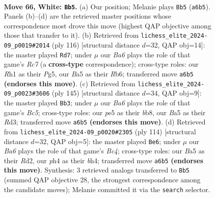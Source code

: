 \documentclass[11pt]{article}
\begin{document}
\clearpage

\begin{figure}[p]\centering
\begin{subfigure}{0.46\textwidth}\centering
\resizebox{\linewidth}{!}{%
\newchessgame
\chessboard[
  setfen={1r6/4b3/Bn1p2kp/B3p3/4P2p/5P2/5K2/7R w - - 1 66},
  showmover=false,
  pgfstyle=straightmove, color=movearrow, markmove={a6-b5}
]}
\caption{}
\end{subfigure}\hfill
\begin{subfigure}{0.46\textwidth}\centering
\resizebox{\linewidth}{!}{%
\newchessgame
\chessboard[
  setfen={8/2R5/1R1n2p1/p3kpP1/P7/1p1r4/6P1/6K1 w - - 10 59},
  showmover=false,
  pgfstyle=straightmove, color=movearrow, markmove={c7-d7}
]}
\caption{}
\end{subfigure}
\\[4pt]
\begin{subfigure}{0.46\textwidth}\centering
\resizebox{\linewidth}{!}{%
\newchessgame
\chessboard[
  setfen={1B6/6pk/5p2/8/2b3P1/3rPPK1/8/4R3 b - - 33 73},
  showmover=false,
  pgfstyle=straightmove, color=movearrow, markmove={c4-b3}
]}
\caption{}
\end{subfigure}\hfill
\begin{subfigure}{0.46\textwidth}\centering
\resizebox{\linewidth}{!}{%
\newchessgame
\chessboard[
  setfen={8/6k1/1r1p2p1/4p3/2B1Pp1b/5P2/3R4/5K2 w - - 8 58},
  showmover=false,
  pgfstyle=straightmove, color=movearrow, markmove={c4-e6}
]}
\caption{}
\end{subfigure}
\caption{\textbf{Move 66, White: \texttt{Bb5}.} (a) Our position; Melanie plays \texttt{Bb5} (\texttt{a6b5}). Panels (b)--(d) are the retrieved master positions whose correspondence most drove this move (highest QAP objective among those that transfer to it). (b) Retrieved from \texttt{lichess\_elite\_2024-09\_p0019\#2014} (ply 116) [structural distance $d$=32, QAP obj=14]: the master played \texttt{Rd7}; under $\mu$ our \emph{Ba6} plays the role of that game's \emph{Rc7} (a \textbf{cross-type} correspondence); cross-type roles: our \emph{R}h1 as their \emph{P}g5, our \emph{B}a5 as their \emph{R}b6; transferred move \texttt{a6b5} \textbf{(endorses this move)}. (c) Retrieved from \texttt{lichess\_elite\_2024-09\_p0023\#3606} (ply 145) [structural distance $d$=34, QAP obj=9]: the master played \texttt{Bb3}; under $\mu$ our \emph{Ba6} plays the role of that game's \emph{Bc5}; cross-type roles: our \emph{p}e5 as their \emph{b}b8, our \emph{B}a5 as their \emph{R}d3; transferred move \texttt{a6b5} \textbf{(endorses this move)}. (d) Retrieved from \texttt{lichess\_elite\_2024-09\_p0020\#2305} (ply 114) [structural distance $d$=32, QAP obj=5]: the master played \texttt{Be6}; under $\mu$ our \emph{Ba6} plays the role of that game's \emph{Bc4}; cross-type roles: our \emph{B}a5 as their \emph{R}d2, our \emph{p}h4 as their \emph{b}h4; transferred move \texttt{a6b5} \textbf{(endorses this move)}. Synthesis: 3 retrieved analogs transferred to \texttt{Bb5} (summed QAP objective 28, the strongest correspondence among the candidate moves); Melanie committed it via the \texttt{search} selector.}
\label{fig:thought-m130}
\end{figure}
\end{document}
